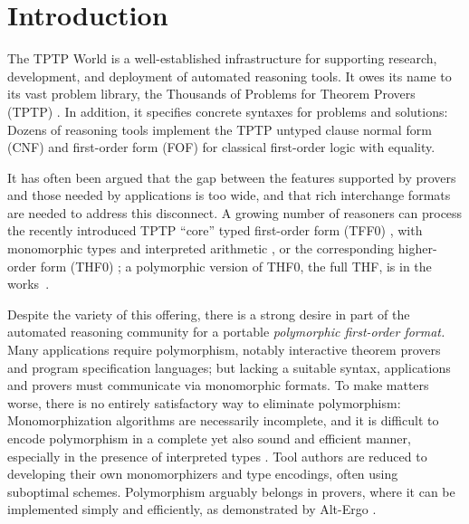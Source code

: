 \section{Introduction}
\label{sec_intro}

The TPTP World \cite{sutcliffe-2010-world} is a well-established infrastructure
for supporting research, development, and deployment of automated reasoning
tools. It owes its name to its vast problem library, the Thousands of Problems for Theorem
Provers (TPTP) \cite{sutcliffe-2009-lib}. In addition, it specifies concrete
syntaxes for problems and solutions:
Dozens of reasoning tools implement the TPTP untyped clause normal form
(CNF) and first-order form (FOF) for classical
first-order logic with equality.

It has often been argued that the gap between the features supported by provers
and those needed by applications is too wide, and that rich interchange formats
are needed to address this disconnect.
A growing number of reasoners can process the
recently introduced TPTP ``core'' typed first-order form (TFF0) \cite{sutcliffe-et-al-2012-tff0},
with monomorphic types and interpreted arithmetic \cite{SPASS-T,vampire-arith},
or the corresponding higher-order form (THF0) \cite{benzmueller-et-al-2008-thf0};
a polymorphic version of THF0, the full THF, is in the works~\cite{sutcliffe-benzmueller-2010}.

Despite the variety of this offering, there is a strong desire in part of the automated
reasoning community for a portable \emph{polymorphic first-order format.} Many applications
require polymorphism, notably interactive theorem provers and program
specification languages; but lacking a suitable syntax, applications
and provers must communicate via monomorphic formats. To make matters worse, there is no entirely
satisfactory way to eliminate polymorphism: Monomorphization algorithms are %
necessarily incomplete,
and it is difficult to encode polymorphism in a complete yet
also sound and efficient manner,
especially in the presence of interpreted types
\cite{blanchette-et-al-2013-types,bobot-paskevich-2011,leino-ruemmer-2010}. Tool authors
are reduced to developing their own monomorphizers and type encodings, often
using suboptimal schemes. Polymorphism arguably belongs in
provers, where it can be implemented simply and efficiently, as demonstrated by
Alt-Ergo \cite{bobot-et-al-2008}.

\pagebreak

